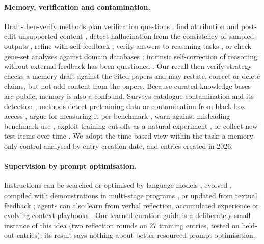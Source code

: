 \documentclass{article} %
\begin{document}
\paragraph{Memory, verification and contamination.}
Draft-then-verify methods plan verification questions \citep{dhuliawala2024chainofverification}, find attribution and post-edit unsupported content \citep{Gao2022RarrResearching}, detect hallucination from the consistency of sampled outputs \citep{Manakul2023SelfcheckgptZeroresource}, refine with self-feedback \citep{Madaan2023SelfrefineIterative}, verify answers to reasoning tasks \citep{Weng2022LargeLanguage}, or check gene-set analyses against domain databases \citep{wang2025geneagent}; intrinsic self-correction of reasoning without external feedback has been questioned \citep{Huang2023LargeLanguage}. Our recall-then-verify strategy checks a memory draft against the cited papers and may restate, correct or delete claims, but not add content from the papers. Because curated knowledge bases are public, memory is also a confound. Surveys catalogue contamination and its detection \citep{Xu2024BenchmarkData,Deng2024UnveilingSpectrum,Ravaut2024ComprehensiveSurvey,Cheng2025SurveyData,Chen2025RecentAdvances}; methods detect pretraining data or contamination from black-box access \citep{Shi2023DetectingPretraining,oren2024proving,golchin2024time,Golchin2025DataContamination}, argue for measuring it per benchmark \citep{sainz2024nlp,Singh2024EvaluationData}, warn against misleading benchmark use \citep{Zhou2023DontMake}, exploit training cut-offs as a natural experiment \citep{Roberts2023DataContamination}, or collect new test items over time \citep{Jain2024LivecodebenchHolistic,White2024LivebenchChallenging}. We adopt the time-based view within the task: a memory-only control analysed by entry creation date, and entries created in 2026.

\paragraph{Supervision by prompt optimisation.}
Instructions can be searched or optimised by language models \citep{Zhou2022LargeLanguage,Pryzant2023AutomaticPrompt,Yang2023LargeLanguage}, evolved \citep{Guo2023EvopromptConnecting,Fernando2023PromptbreederSelfreferential,agrawal2026gepa}, compiled with demonstrations in multi-stage programs \citep{Khattab2023DspyCompiling,Opsahlong2024OptimizingInstructions}, or updated from textual feedback \citep{Yuksekgonul2024TextgradAutomatic}; agents can also learn from verbal reflection, accumulated experience or evolving context playbooks \citep{Shinn2023ReflexionLanguage,Zhao2023ExpelLlm,Zhang2025AgenticContext}. Our learned curation guide is a deliberately small instance of this idea (two reflection rounds on 27 training entries, tested on held-out entries); its result says nothing about better-resourced prompt optimisation.
\end{document}
